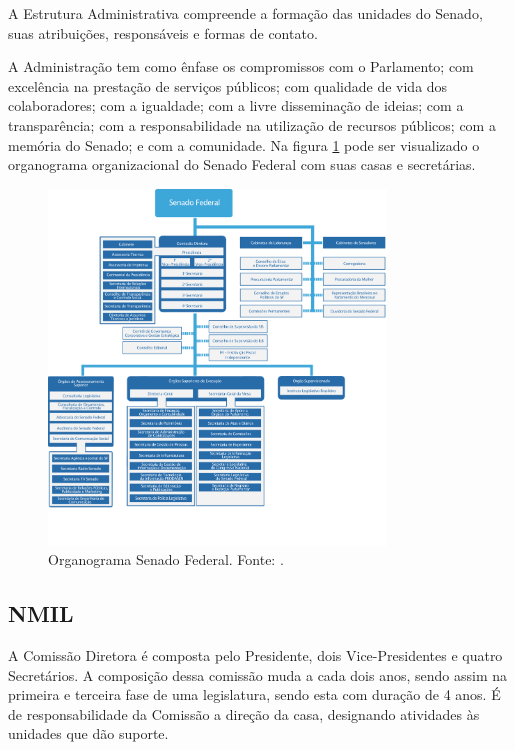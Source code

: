 A Estrutura Administrativa compreende a formação das unidades do Senado, suas
atribuições, responsáveis e formas de contato.

A Administração tem como ênfase os compromissos com o Parlamento; com excelência na prestação de serviços públicos; com qualidade de vida dos colaboradores; com a igualdade; com a livre disseminação de ideias; com a transparência; com a responsabilidade na utilização
de recursos públicos; com a memória do Senado; e com a comunidade. Na figura \ref{img:organograma_senado} pode ser visualizado o organograma organizacional do Senado Federal com suas casas e secretárias.

\begin{figure}[H]
	\centering
	\includegraphics[width=0.8\textwidth]{figuras/organograma_senado.png}
	\caption{Organograma Senado Federal. Fonte: .}
	\label{img:organograma_senado}
\end{figure}

\subsection{NMIL}

A Comissão Diretora é composta pelo Presidente, dois Vice-Presidentes e quatro
Secretários. A composição dessa comissão muda a cada dois anos, sendo assim na primeira e terceira fase de uma legislatura, sendo esta com duração de 4 anos. É de responsabilidade da Comissão a direção da casa, designando atividades às unidades que dão suporte.

